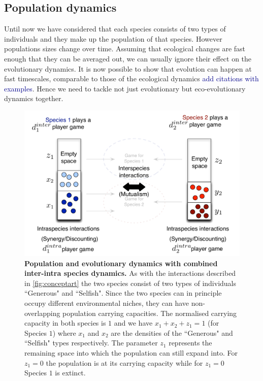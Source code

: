 \documentclass[12pt]{article}
\newcommand{\cha}[1]{\textcolor{darkblue}{#1}}
\begin{document}
\subsection{Population dynamics}

Until now we have considered that each species consists of two types of individuals and they make up the population of that species.
However populations sizes change over time. 
Assuming that ecological changes are fast enough that they can be averaged out, we can usually ignore their effect on the evolutionary dynamics.
It is now possible to show that evolution can happen at fast timescales, comparable to those of the ecological dynamics \cha{add citations with examples}.
Hence we need to tackle not just evolutionary but eco-evolutionary dynamics together.
%
\begin{figure}
\begin{center}
\includegraphics[width=\columnwidth]{../Figures/popdyninterintra.pdf}
\caption{\small{
\textbf{Population and evolutionary dynamics with combined inter-intra species dynamics.}
As with the interactions described in \ref{fig:conceptart} the two species consist of two types of individuals ``Generous" and ``Selfish".
Since the two species can in principle occupy different environmental niches, they  can have non-overlapping population carrying capacities.
The normalised carrying capacity in both species is $1$ and we have $x_1 + x_2 + z_1 = 1$ (for Species $1$) where $x_1$ and $x_2$ are the densities of the ``Generous" and ``Selfish" types respectively. 
The parameter $z_1$ represents the remaining space into which the population can still expand into.
For $z_1 = 0$ the population is at its carrying capacity while for $z_1 = 0$ Species $1$ is extinct. }
\label{fig:conceptartpopdyn}
}
\end{center}
\end{figure}
%
\end{document}
